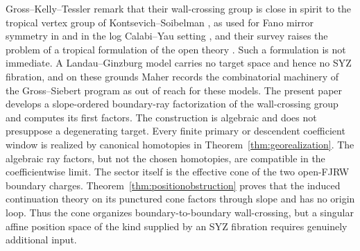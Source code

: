 \documentclass[11pt]{amsart}
\theoremstyle{definition}
\theoremstyle{remark}
\begin{document}
Gross--Kelly--Tessler remark \cite[Rem.~0.8]{GKT} that their wall-crossing group is
close in spirit to the tropical vertex group of Kontsevich--Soibelman \cite{KS06},
as used for Fano mirror symmetry in \cite{GPS10,Gross10} and in the log
Calabi--Yau setting \cite{GHK15}, and their survey raises
the problem of a tropical formulation of the open theory \cite{GKTsurvey}. Such a
formulation is not immediate. A Landau--Ginzburg model carries no target space and
hence no SYZ fibration, and on these grounds Maher \cite[Rem.~5.1.1]{Maher} records
the combinatorial machinery of the Gross--Siebert program as out of reach for these
models. The present paper develops a slope-ordered boundary-ray factorization
of the wall-crossing group and computes its first factors.  The construction
is algebraic and does not presuppose a degenerating target. Every finite
primary or descendent coefficient window is
realized by canonical homotopies in Theorem~\ref{thm:georealization}.  The
algebraic ray factors, but not the chosen homotopies, are compatible in the
coefficientwise limit.  The sector itself is the effective cone of the
two open-FJRW boundary charges.  Theorem~\ref{thm:positionobstruction} proves
that the induced continuation theory on its punctured cone factors through
slope and has no origin loop.  Thus the cone organizes boundary-to-boundary
wall-crossing, but a singular affine position space of the kind supplied by an
SYZ fibration requires genuinely additional input.
\end{document}
